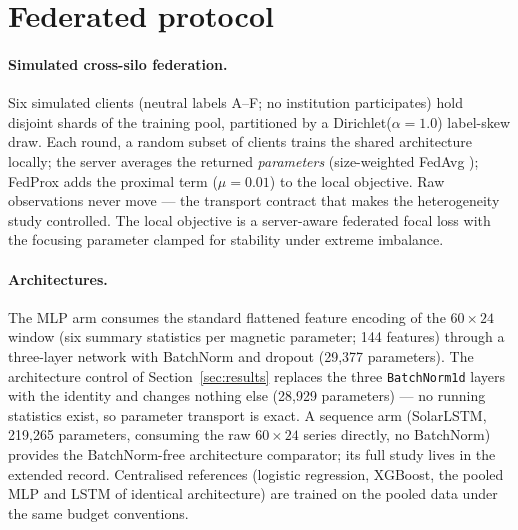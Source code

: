 \section{Federated protocol}\label{sec:method}

\paragraph{Simulated cross-silo federation.}
Six simulated clients (neutral labels A--F; no institution
participates) hold disjoint shards of the training pool, partitioned
by a Dirichlet($\alpha{=}1.0$) label-skew draw. Each round, a random
subset of clients trains the shared architecture locally; the server
averages the returned \emph{parameters} (size-weighted FedAvg
\cite{mcmahan2017}); FedProx \cite{li2020} adds the proximal term
($\mu = 0.01$) to the local objective. Raw observations never move
--- the transport contract that makes the heterogeneity study
controlled. The local objective is a server-aware federated focal
loss \cite{lin2017,sarkar2020} with the focusing parameter clamped
for stability under extreme imbalance.

\paragraph{Architectures.}
The MLP arm consumes the standard flattened feature encoding of the
$60\times24$ window (six summary statistics per magnetic parameter;
144 features) through a three-layer network with BatchNorm and
dropout (29{,}377 parameters). The architecture control of
Section~\ref{sec:results} replaces the three \texttt{BatchNorm1d}
layers with the identity and changes nothing else (28{,}929
parameters) --- no running statistics exist, so parameter transport
is exact. A sequence arm (SolarLSTM, 219{,}265 parameters, consuming
the raw $60\times24$ series directly, no BatchNorm) provides the
BatchNorm-free architecture comparator; its full study lives in the
extended record. Centralised references (logistic regression,
XGBoost, the pooled MLP and LSTM of identical architecture) are
trained on the pooled data under the same budget conventions.

